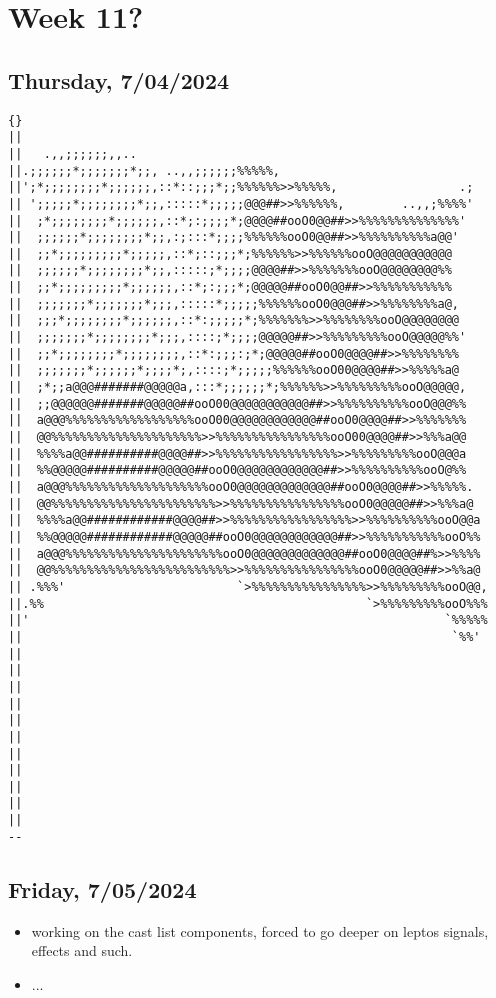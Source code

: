 \newpage
\section{Week 11?}

\subsection*{Thursday, 7/04/2024}
\begin{verbatim}
{} 
|| 
||   .,,;;;;;;,,.. 
||.;;;;;;*;;;;;;;*;;, ..,,;;;;;;%%%%%, 
||';*;;;;;;;;*;;;;;;,::*::;;;*;;%%%%%%>>%%%%%,                 .; 
|| ';;;;;*;;;;;;;;*;;,:::::*;;;;;@@@##>>%%%%%%,        ..,,;%%%%' 
||  ;*;;;;;;;;*;;;;;;,::*;:;;;;*;@@@@##ooO0@@##>>%%%%%%%%%%%%%%' 
||  ;;;;;;*;;;;;;;;*;;,:;:::*;;;;%%%%%%ooO0@@##>>%%%%%%%%%%a@@' 
||  ;;*;;;;;;;;;*;;;;;,::*;::;;;*;%%%%%%>>%%%%%%ooO@@@@@@@@@@@ 
||  ;;;;;;*;;;;;;;;*;;,:::::;*;;;;@@@@##>>%%%%%%%ooO@@@@@@@@%% 
||  ;;*;;;;;;;;;*;;;;;;,::*;:;;;*;@@@@@##ooO0@@##>>%%%%%%%%%%% 
||  ;;;;;;;*;;;;;;;*;;;,:::::*;;;;;%%%%%%ooO0@@@##>>%%%%%%%%a@, 
||  ;;;*;;;;;;;;*;;;;;;,::*:;;;;;*;%%%%%%%>>%%%%%%%%ooO@@@@@@@@ 
||  ;;;;;;;*;;;;;;;;*;;;,::::;*;;;;@@@@@##>>%%%%%%%%%ooO@@@@@%%' 
||  ;;*;;;;;;;;*;;;;;;;;,::*:;;;:;*;@@@@@##ooO0@@@@##>>%%%%%%%% 
||  ;;;;;;;*;;;;;;*;;;;*;,::::;*;;;;;%%%%%%ooO00@@@@##>>%%%%%a@ 
||  ;*;;a@@@#######@@@@@a,:::*;;;;;;*;%%%%%%>>%%%%%%%%%ooO@@@@@, 
||  ;;@@@@@@#######@@@@@##ooO00@@@@@@@@@@@##>>%%%%%%%%%%ooO@@@%% 
||  a@@@%%%%%%%%%%%%%%%%%%ooO00@@@@@@@@@@@@##ooO0@@@@##>>%%%%%%% 
||  @@%%%%%%%%%%%%%%%%%%%%%>>%%%%%%%%%%%%%%%%ooO00@@@@##>>%%%a@@ 
||  %%%%a@@##########@@@@##>>%%%%%%%%%%%%%%%%%>>%%%%%%%%%ooO@@@a 
||  %%@@@@@##########@@@@@##ooO0@@@@@@@@@@@@##>>%%%%%%%%%%ooO@%% 
||  a@@@%%%%%%%%%%%%%%%%%%%%ooO0@@@@@@@@@@@@@##ooO0@@@@##>>%%%%%. 
||  @@%%%%%%%%%%%%%%%%%%%%%%%>>%%%%%%%%%%%%%%%%ooO0@@@@@##>>%%%a@ 
||  %%%%a@@############@@@@##>>%%%%%%%%%%%%%%%%%>>%%%%%%%%%%ooO@@a 
||  %%@@@@@############@@@@@##ooO0@@@@@@@@@@@@##>>%%%%%%%%%%%ooO%% 
||  a@@@%%%%%%%%%%%%%%%%%%%%%%ooO0@@@@@@@@@@@@@##ooO0@@@@##%>>%%%% 
||  @@%%%%%%%%%%%%%%%%%%%%%%%%%>>%%%%%%%%%%%%%%%%ooO0@@@@@##>>%%a@ 
|| .%%%'                        `>%%%%%%%%%%%%%%%%>>%%%%%%%%%ooO@@, 
||.%%                                             `>%%%%%%%%%ooO%%% 
||'                                                          `%%%%% 
||                                                            `%%' 
|| 
|| 
|| 
|| 
|| 
|| 
|| 
|| 
|| 
|| 
|| 
--
\end{verbatim}

\subsection*{Friday, 7/05/2024}
\begin{itemize}
    \item working on the cast list components, forced to go deeper on leptos
        signals, effects and such.
    \item ...
\end{itemize}
